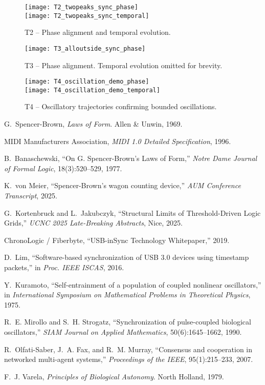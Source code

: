\documentclass[11pt]{article}
\begin{document}
\begin{figure}[htbp!]
  \centering
  \texttt{[image: T2\_twopeaks\_sync\_phase]}\\[4pt]
  \texttt{[image: T2\_twopeaks\_sync\_temporal]}
  \caption{T2 -- Phase alignment and temporal evolution.}
\end{figure}

\begin{figure}[htbp!]
  \centering
  \texttt{[image: T3\_alloutside\_sync\_phase]}
  \caption{T3 -- Phase alignment. Temporal evolution omitted for brevity.}
\end{figure}

\begin{figure}[htbp!]
  \centering
  \texttt{[image: T4\_oscillation\_demo\_phase]}\\[4pt]
  \texttt{[image: T4\_oscillation\_demo\_temporal]}
  \caption{T4 -- Oscillatory trajectories confirming bounded oscillations.}
\end{figure}

\begin{thebibliography}{99}
\setlength{\itemsep}{2pt}

G.~Spencer-Brown, \emph{Laws of Form}. Allen \& Unwin, 1969.

MIDI Manufacturers Association, \emph{MIDI 1.0 Detailed Specification}, 1996.

B.~Banaschewski, ``On G. Spencer-Brown's Laws of Form,'' \emph{Notre Dame Journal of Formal Logic}, 18(3):520--529, 1977.

K.~von Meier, ``Spencer-Brown's wagon counting device,'' \emph{AUM Conference Transcript}, 2025. %

G.~Kortenbruck and L.~Jakubczyk, ``Structural Limits of Threshold-Driven Logic Grids,'' \emph{UCNC 2025 Late-Breaking Abstracts}, Nice, 2025.

ChronoLogic / Fiberbyte, ``USB-inSync Technology Whitepaper,'' 2019. %

D.~Lim, ``Software-based synchronization of USB 3.0 devices using timestamp packets,'' in \emph{Proc. IEEE ISCAS}, 2016.

Y.~Kuramoto, ``Self-entrainment of a population of coupled nonlinear oscillators,'' in \emph{International Symposium on Mathematical Problems in Theoretical Physics}, 1975.

R.~E. Mirollo and S.~H. Strogatz, ``Synchronization of pulse-coupled biological oscillators,'' \emph{SIAM Journal on Applied Mathematics}, 50(6):1645--1662, 1990.

R.~Olfati-Saber, J.~A. Fax, and R.~M. Murray, ``Consensus and cooperation in networked multi-agent systems,'' \emph{Proceedings of the IEEE}, 95(1):215--233, 2007.

F.~J. Varela, \emph{Principles of Biological Autonomy}. North Holland, 1979.

\end{thebibliography}
\end{document}
